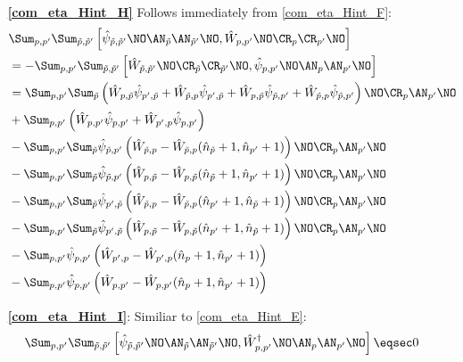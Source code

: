 \begin{appendix}
\begin{itemize}
\begin{subequations}
\begin{align}
\end{align}
\end{subequations}
\item[\textbf{\ref{com_eta_Hint_H}}] Follows immediately from \ref{com_eta_Hint_F}:
\begin{align}
&\Sum_{p, p^\prime}\Sum_{\tilde p,\tilde p^\prime} \left[\hat\psi_{\tilde p,\tilde p^\prime}\NO\AN_{\tilde p}\AN_{\tilde p^\prime}\NO,\hat W_{p,p^\prime}\NO\CR_p\CR_{p^\prime}\NO\right]\nonumber\\
&=-\Sum_{p, p^\prime}\Sum_{\tilde p,\tilde p^\prime} \left[\hat W_{\tilde p,\tilde p^\prime}\NO\CR_{\tilde p}\CR_{\tilde p^\prime}\NO,\hat\psi_{p, p^\prime}\NO\AN_{p}\AN_{p^\prime}\NO\right]\\
&=\Sum_{p, p^\prime}\Sum_{\tilde p} \left(\hat W_{p,\tilde p}\hat \psi_{p^\prime,\tilde p}+\hat W_{\tilde p,p}\hat \psi_{p^\prime,\tilde p}+\hat W_{p,\tilde p}\hat \psi_{\tilde p,p^\prime}  + \hat W_{\tilde p,p}\hat \psi_{\tilde p,p^\prime}\right)\NO\CR_{p}\AN_{p^\prime}\NO \\
&+\Sum_{p, p^\prime}\left( \hat W_{ p, p^\prime}\hat \psi_{p,p^\prime}+ \hat W_{p^\prime,p}\hat \psi_{p,p^\prime}\right)\nonumber\\
&- \Sum_{p, p^\prime}\Sum_{\tilde p}\hat \psi_{\tilde p,p^\prime} \left(\hat W_{ \tilde p,p}-\hat W_{ \tilde p,p}(\hat n_{\tilde p}+1,\hat n_{p^\prime}+1)\right)\NO\CR_{p}\AN_{p^\prime}\NO\nonumber\\
&-\Sum_{p, p^\prime}\Sum_{\tilde p}\hat \psi_{\tilde p,p^\prime} \left(\hat W_{p,\tilde p}-\hat W_{p,\tilde p}(\hat n_{\tilde p}+1,\hat n_{p^\prime}+1)\right)\NO\CR_{p}\AN_{p^\prime}\NO \nonumber\\
&-\Sum_{p, p^\prime}\Sum_{\tilde p}\hat \psi_{p^\prime,\tilde p} \left(\hat W_{\tilde p,p}-\hat W_{\tilde p,p}(\hat n_{p^\prime}+1,\hat n_{\tilde p}+1)\right)\NO\CR_{p}\AN_{p^\prime}\NO \nonumber\\
&-\Sum_{p, p^\prime}\Sum_{\tilde p}\hat \psi_{p^\prime,\tilde p} \left(\hat W_{p, \tilde p}-\hat W_{p, \tilde p}(\hat n_{p^\prime}+1,\hat n_{\tilde p}+1)\right)\NO\CR_{p}\AN_{p^\prime}\NO \nonumber\\
&-\Sum_{p, p^\prime}\hat \psi_{p,p^\prime} \left(\hat W_{p^\prime,p}-\hat W_{p^\prime,p}(\hat n_p+1,\hat n_{p^\prime}+1)\right) \nonumber\\
&-\Sum_{p, p^\prime}\hat \psi_{p,p^\prime} \left(\hat W_{ p, p^\prime}-\hat W_{ p, p^\prime}(\hat n_p+1,\hat n_{p^\prime}+1)\right)\nonumber
\end{align}
\item[\textbf{\ref{com_eta_Hint_I}}:] Similiar to \ref{com_eta_Hint_E}:
\begin{align} 
\Sum_{p, p^\prime}\Sum_{\tilde p,\tilde p^\prime} \left[\hat\psi_{\tilde p,\tilde p^\prime}\NO\AN_{\tilde p}\AN_{\tilde p^\prime}\NO,\hat W_{p,p^\prime}^\dagger\NO\AN_p\AN_{p^\prime}\NO\right]\eqsec 0
\end{align}
\end{itemize}

\end{appendix}
